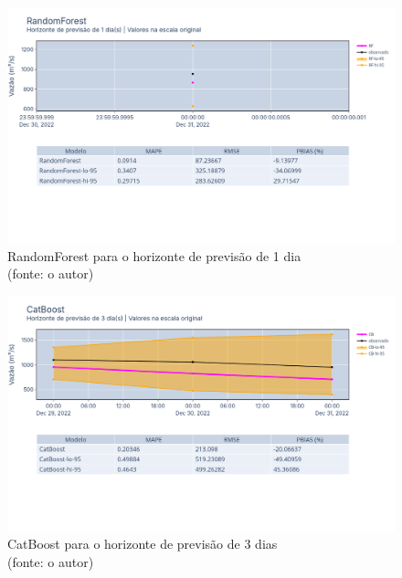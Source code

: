 \begin{figure}[!h]
	\centering
	\includegraphics[scale=0.33]{Figuras/jequiti/resultados/RandomForest_fh1.png}
	\caption{RandomForest para o horizonte de previsão de 1 dia\\(fonte: o autor)}
	\label{fig:jequiti_RandomForest_fh1}
\end{figure}

\begin{figure}[!h]
	\centering
	\includegraphics[scale=0.33]{Figuras/jequiti/resultados/CatBoost_fh3.png}
	\caption{CatBoost para o horizonte de previsão de 3 dias\\(fonte: o autor)}
	\label{fig:jequiti_CatBoostRegressor_fh3}
\end{figure}

